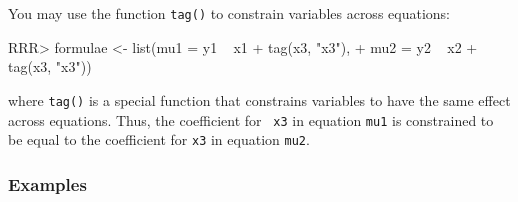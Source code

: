 You may use the function {\tt tag()} to constrain variables across
equations:
\begin{Schunk}
\begin{Sinput}
RRR> formulae <- list(mu1 = y1 ~ x1 + tag(x3, "x3"), 
+                  mu2 = y2 ~ x2 + tag(x3, "x3"))
\end{Sinput}
\end{Schunk}
where {\tt tag()} is a special function that constrains variables to
have the same effect across equations.  Thus, the coefficient for {\tt
x3} in equation {\tt mu1} is constrained to be equal to the
coefficient for {\tt x3} in equation {\tt mu2}.  

\subsubsection{Examples}

